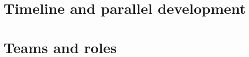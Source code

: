 \documentclass{beamer}
\begin{document}
	\section{Timeline and parallel development}
	
	\section{Teams and roles}
\end{document}
